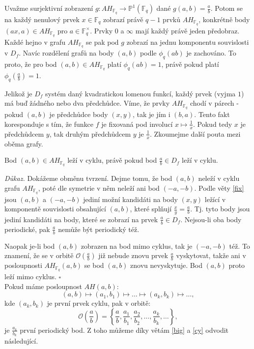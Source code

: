 \documentclass[12pt]{report}
\begin{document}
Uvažme surjektivní zobrazení $g : AH_{\mathbb{F}_q} \longrightarrow \mathbb{P}^1 (\mathbb{F}_q)$ dané $g(a,b) = \frac{a}{b}$. Potom se na každý nenulový prvek $x \in \mathbb{F}_q$ zobrazí právě $q-1$ prvků $AH_{\mathbb{F}_q}$, konkrétně body $(ax,a) \in AH_{\mathbb{F}_q}$ pro $a \in \mathbb{F}_q ^{\times}$. Prvky $0$ a $\infty$ mají každý právě jeden předobraz. Každé hejno v grafu $AH_{\mathbb{F}_q}$ se pak pod $g$ zobrazí na jednu komponentu souvislosti v $D_f$. Navíc rozdělení grafů na body $(a,b)$ podle $\phi_q(ab)$ je zachováno. To proto, že pro bod $(a,b) \in AH_{\mathbb{F}_q}$ platí $\phi_q(ab) =1$, právě pokud platí $\phi_q \left(\frac{a}{b} \right) = 1$.

Jelikož je $D_f$ systém daný kvadratickou lomenou funkcí, každý prvek (vyjma $1$) má buď žádného nebo dva předchůdce. Víme, že prvky $AH_{\mathbb{F}_q}$ chodí v párech - pokud $(a,b)$ je předchůdce body $(x,y)$, tak je jím i $(b,a)$. Tento fakt koresponduje s tím, že funkce $f$ je fixovaná pod involucí $x \longmapsto \frac{1}{x}$. Pokud tedy $x$ je předchůdcem $y$, tak druhým předchůdcem $y$ je $\frac{1}{x}$. Zkoumejme další pouta mezi oběma grafy.

\begin{veta}\label{cy}
Bod $(a,b) \in AH_{\mathbb{F}_q}$ leží v cyklu, právě pokud bod $\frac{a}{b} \in D_f$ leží v cyklu.
\end{veta}
\noindent \textit{Důkaz.} Dokážeme obměnu tvrzení. Dejme tomu, že bod $(a,b)$ neleží v cyklu grafu $AH_{\mathbb{F}_q}$, poté dle symetrie v něm neleží ani bod $(-a,-b)$. Podle věty \ref{fix} jsou $(a,b)$ a $(-a,-b)$ jediní možní kandidáti na body $(x,y)$ ležící v komponentě souvislosti obsahující $(a,b)$, které splňují $\frac{x}{y} = \frac{a}{b}$. Tj. tyto body jsou jediní kandidáti na body, které se zobrazí na prvek $\frac{a}{b} \in D_f$. Nejsou-li oba body periodické, pak $\frac{a}{b}$ nemůže být periodický též.

Naopak je-li bod $(a,b)$ zobrazen na bod mimo cyklus, tak je $(-a,-b)$ též. To znamení, že se v orbitě $\mathcal{O}\left(\frac{a}{b}\right)$ již nebude znovu prvek $\frac{a}{b}$ vyskytovat, takže ani v posloupnosti $AH_{\mathbb{F}_q} (a,b)$ se bod $(a,b)$ znovu nevyskytuje. Bod $(a,b)$ proto leží mimo cyklus. \hfill $\square$\\

Pokud máme posloupnost $AH(a,b)$:
$$(a,b) \longmapsto (a_1,b_1) \longmapsto \dots \longmapsto (a_k,b_k) \longmapsto \dots,$$
kde $(a_k,b_k)$ je první prvek cyklu, pak v orbitě: $$\mathcal{O}\left(\frac{a}{b}\right) =\left\lbrace \frac{a}{b},\frac{a_1}{b_1},\frac{a_2}{b_2},\dots,\frac{a_k}{b_k},\dots \right\rbrace,$$
je $\frac{a_k}{b_k}$ první periodický bod. Z toho můžeme díky větám \ref{big} a \ref{cy} odvodit následující.
\end{document}
